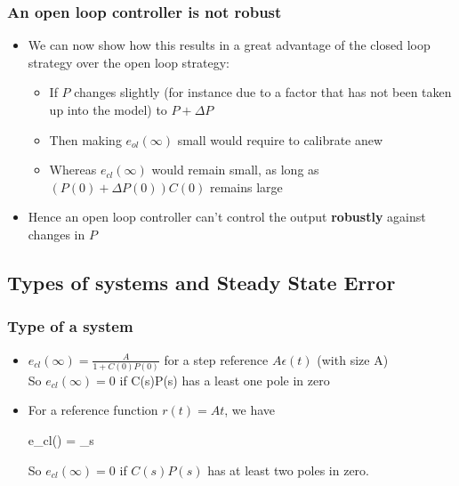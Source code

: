 \begin{frame}
	\frametitle{An open loop controller is not robust}
	\begin{itemize}
		\item We can now show how this results in a great advantage of the closed loop strategy over the open loop strategy:
		\begin{itemize}
			\item If $P$ changes slightly (for instance due to a factor that has not been taken up into the model) to $P+\Delta P$
			\item Then making $e_{ol}(\infty)$ small would require to calibrate anew
			\item Whereas $e_{cl} (\infty)$ would remain small, as long as $(P(0)+\Delta P(0))C(0)$ remains large
			
		\end{itemize}
		\item Hence an open loop controller can't control the output \textbf{robustly} against changes in $P$
	\end{itemize}
\end{frame}

\subsection[Types of systems and SS-error]{Types of systems and Steady State Error}

\begin{frame}
	\frametitle{Type of a system}
	\begin{itemize}
		\item $e_{cl}(\infty) = \frac{A}{1+C(0)P(0)}$ for a step reference $A \epsilon (t)$ (with size A)\\
		So $e_{cl}(\infty) = 0$ if C(s)P(s) has a least one pole in zero
		\item For a reference function $r(t) = At$, we have
		\begin{flalign*}
			e_{cl}(\infty) = \lim\limits_{s }  
		\end{flalign*}
		So $e_{cl}(\infty) = 0$ if $C(s)P(s)$ has at least two poles in zero.
	\end{itemize}
\end{frame}

